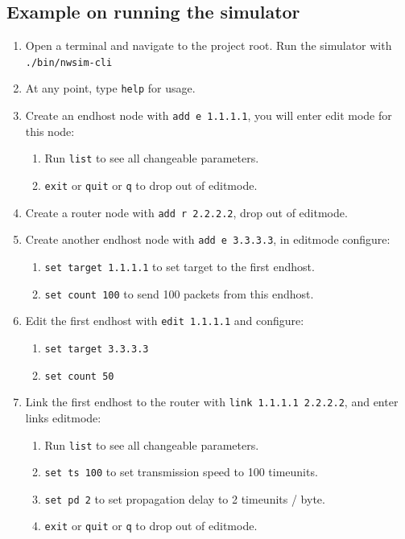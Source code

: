 \subsection{Example on running the simulator}
\begin{enumerate}
    \item Open a terminal and navigate to the project root. Run the simulator with \texttt{./bin/nwsim-cli}
    \item At any point, type \texttt{help} for usage.
    \item Create an endhost node with \texttt{add e 1.1.1.1}, you will enter edit mode for this node:
    \begin{enumerate}
        \item Run \texttt{list} to see all changeable parameters.
        \item \texttt{exit} or \texttt{quit} or \texttt{q} to drop out of editmode.
    \end{enumerate}
    \item Create a router node with \texttt{add r 2.2.2.2}, drop out of editmode.
    \item Create another endhost node with \texttt{add e 3.3.3.3}, in editmode configure:
    \begin{enumerate}
        \item \texttt{set target 1.1.1.1} to set target to the first endhost.
        \item \texttt{set count 100} to send 100 packets from this endhost.
    \end{enumerate}
    \item Edit the first endhost with \texttt{edit 1.1.1.1} and configure:
    \begin{enumerate}
        \item \texttt{set target 3.3.3.3}
        \item \texttt{set count 50}
    \end{enumerate}
    \item Link the first endhost to the router with \texttt{link 1.1.1.1 2.2.2.2}, and enter links editmode:
    \begin{enumerate}
        \item Run \texttt{list} to see all changeable parameters.
        \item \texttt{set ts 100} to set transmission speed to 100 timeunits.
        \item \texttt{set pd 2} to set propagation delay to 2 timeunits / byte.
        \item \texttt{exit} or \texttt{quit} or \texttt{q} to drop out of editmode.

\end{enumerate}
\end{enumerate}
